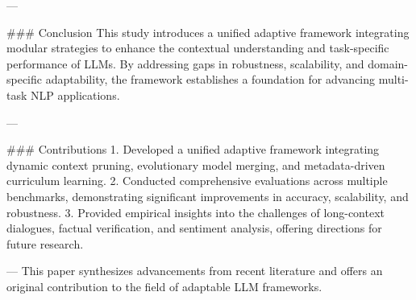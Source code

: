 ---

### Conclusion  
This study introduces a unified adaptive framework integrating modular strategies to enhance the contextual understanding and task-specific performance of LLMs. By addressing gaps in robustness, scalability, and domain-specific adaptability, the framework establishes a foundation for advancing multi-task NLP applications.

---

### Contributions  
1. Developed a unified adaptive framework integrating dynamic context pruning, evolutionary model merging, and metadata-driven curriculum learning.  
2. Conducted comprehensive evaluations across multiple benchmarks, demonstrating significant improvements in accuracy, scalability, and robustness.  
3. Provided empirical insights into the challenges of long-context dialogues, factual verification, and sentiment analysis, offering directions for future research.  

---  
This paper synthesizes advancements from recent literature and offers an original contribution to the field of adaptable LLM frameworks.